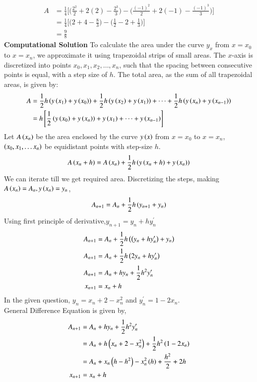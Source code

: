 \documentclass[journal]{IEEEtran}
\begin{document}
\begin{align}
A &= \frac{1}{4} \bigg[ \bigg( \frac{2^2}{2} + 2(2) - \frac{2^3}{3} \bigg) - \bigg( \frac{(-1)^2}{2} + 2(-1) - \frac{(-1)^3}{3} \bigg) \bigg] \\
&= \frac{1}{4} \bigg[ \bigg( 2 + 4 - \frac{8}{3} \bigg) - \bigg( \frac{1}{2} - 2 + \frac{1}{3} \bigg) \bigg]\\
&=\frac{9}{8}
\end{align}
\textbf{Computational Solution}
To calculate the area under the curve $y_x$ from $x = x_0$ to $x = x_n$, we approximate it using trapezoidal strips of small areas. The $x$-axis is discretized into points $x_0, x_1, x_2, \dots, x_n$, such that the spacing between consecutive points is equal, with a step size of $h$. 
The total area, as the sum of all trapezoidal areas, is given by:
\begin{align}
  A&=\frac{1}{2}h\left(y\left(x_1\right)+y\left(x_0\right)\right)+ \frac{1}{2}h\left(y\left(x_2\right)+y\left(x_1\right)\right)+\dots+\frac{1}{2}h\left(y\left(x_n\right)+y\left(x_{n-1}\right)\right)\\
  &=h{}\left[\frac{1}{2}\left(y\left(x_0\right)+y\left(x_n\right)\right)+ y\left(x_1\right)+\dots+y\left(x_{n-1}\right)\right]
\end{align}
Let $A\left(x_n\right)$ be the area enclosed by the curve $y\left(x\right)$ from $x=x_0$ to $x=x_n$, $\left(x_0, x_1, \dots x_n\right)$ be equidistant points with step-size $h$.
\begin{align}
  A\left(x_n+h\right)=A\left(x_n\right)+\frac{1}{2}h\left(y\left(x_n+h\right)+y\left(x_n\right)\right)
\end{align}
We can iterate till we get required area.
Discretizing the steps, making $A\left(x_n\right)=A_n, y\left(x_n\right)=y_n$,
\begin{align}
 A_{n+1}=A_n+\frac{1}{2}h\left(y_{n+1}+y_n\right)
\end{align}
Using first principle of derivative,$y_{n+1}=y_n+hy^{\prime}_n$
\begin{align}
  A_{n+1}&=A_n+\frac{1}{2}h\left(\left(y_{n}+hy^{\prime}_n\right)+y_n\right)\\
  A_{n+1}&=A_n+\frac{1}{2}h\left(2y_n+hy^{\prime}_n\right)\\
  A_{n+1}&=A_n+hy_n+\frac{1}{2}h^2y^{\prime}_n\\
  x_{n+1}&=x_n+h
\end{align}
In the given question, $y_n=x_n+2-x_n^2$ and $y^{\prime}_n=1-2x_n$.\\
General Difference Equation is given by,
\begin{align}
  A_{n+1}&=A_n+hy_n+\frac{1}{2}h^2y^{\prime}_n\\
  &=A_n+h\left(x_n+2-x_n^2\right)+\frac{1}{2}h^2\left(1-2x_n\right)\\
  &=A_n+x_n\left(h-h^2\right)-x_n^2\left(h\right)+\frac{h^2}{2}+2h\\
  x_{n+1}&=x_n+h
\end{align}
\end{document}

